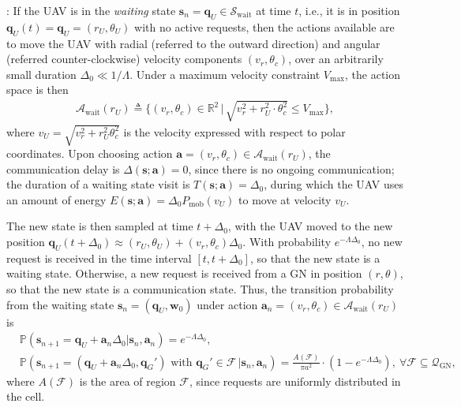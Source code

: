 \documentclass[12pt, draftcls, onecolumn]{IEEEtran}
\theoremstyle{plain}
\theoremstyle{definition}
\theoremstyle{remark}
\begin{document}
: If the UAV is in the \emph{waiting} state $\mathbf{s}_{n} = \mathbf{q}_{U} \in \mathcal{S}_{\mathrm{wait}}$ at time $t$, i.e., it is in position $\mathbf{q}_{U}(t){=}\mathbf{q}_{U}{=}(r_{U},\theta_{U})$ with no active requests, then the actions available are to move the UAV with radial (referred to the outward direction) and angular (referred counter-clockwise) velocity components $(v_{r},\theta_{c})$, over an arbitrarily small duration $\Delta_{0}{\ll}1/\Lambda$. Under a maximum velocity constraint $V_{\mathrm{max}}$, the action space is then 
\begin{align}\label{eq:WaitActions}
	\mathcal{A}_{\mathrm{wait}}(r_U) \triangleq \Big\{(v_{r},\theta_{c}) \in \mathbb R^{2} \, \Big| \, \sqrt{v_{r}^{2} + r_U^2\cdot \theta_{c}^{2}}\leq V_{\mathrm{max}} \Big\},
\end{align}
where $v_{U}=\sqrt{v_{r}^{2}{+}r_{U}^{2}\theta_{c}^{2}}$ is the velocity expressed with respect to polar coordinates. Upon choosing action $\mathbf{a}{=}(v_{r},\theta_{c}){\in}\mathcal{A}_{\mathrm{wait}}(r_{U})$, the communication delay is $\Delta(\mathbf{s};\mathbf{a}){=}0$, since there is no ongoing communication; the duration of a waiting state visit is $T(\mathbf{s};\mathbf{a}){=}\Delta_{0}$, during which the UAV uses an amount of energy $E(\mathbf{s};\mathbf{a}){=}\Delta_{0}P_{\mathrm{mob}} \left(v_{U}\right)$ to move at velocity $v_{U}$.

The new state is then sampled at time $t{+}\Delta_{0}$, with the UAV moved to the new position $\mathbf{q}_{U}(t{+}\Delta_{0}){\approx}(r_{U},\theta_{U}){+}(v_{r},\theta_{c})\Delta_{0}$. With probability $e^{-\Lambda \Delta_{0}}$, no new request is received in the time interval $[t,t{+}\Delta_{0}]$, so that the new state is a waiting state.  Otherwise, a new request is received from a GN in position $(r,\theta)$, so that the new state is a communication state. Thus, the transition probability from the waiting state $\mathbf{s}_{n}{=}(\mathbf{q}_{U},\mathbf{w}_{0})$ under action $\mathbf{a}_{n}{=}(v_{r},\theta_{c}){\in}\mathcal{A}_{\mathrm{wait}}(r_{U})$ is 
\begin{align}\label{eq:CommTransProb}
    &\mathbb{P}(\mathbf{s}_{n+1}=\mathbf q_U+\mathbf a_n\Delta_0|\mathbf{s}_n,\mathbf{a}_n) = e^{-\Lambda \Delta_{0}},\\\label{eq:R0ContTrProb}
    &\mathbb{P}(\mathbf{s}_{n+1}=(\mathbf q_U+\mathbf a_n\Delta_0,\mathbf q_G') \text{ with } \mathbf q_G' \in \mathcal{F} \,|\mathbf{s}_n,\mathbf{a}_n) =\frac{A(\mathcal{F})}{\pi a^2} \cdot (1-e^{-\Lambda \Delta_{0}}),\ \forall \mathcal{F}\subseteq \mathcal{Q}_{\mathrm{GN}},
\end{align}
where $A(\mathcal{F})$ is the area of region $\mathcal{F}$, since requests are uniformly distributed in the cell.
\end{document}

